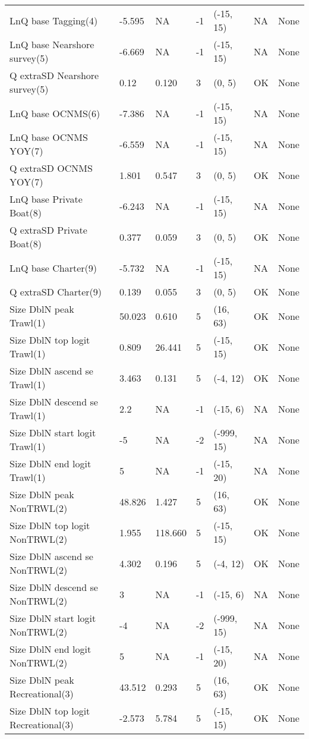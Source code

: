 \documentclass[11pt,
  letterpaper,
]{article}
\begin{document}
\begin{landscape}
\begin{longtable}[t]{>{\raggedright\arraybackslash}p{7.5cm}lllll>{\raggedright\arraybackslash}p{3.5cm}}
LnQ base Tagging(4) & -5.595 & NA & -1 & (-15, 15) & NA & None\\
LnQ base Nearshore survey(5) & -6.669 & NA & -1 & (-15, 15) & NA & None\\
Q extraSD Nearshore survey(5) & 0.12 & 0.120 & 3 & (0, 5) & OK & None\\
LnQ base OCNMS(6) & -7.386 & NA & -1 & (-15, 15) & NA & None\\
LnQ base OCNMS YOY(7) & -6.559 & NA & -1 & (-15, 15) & NA & None\\
Q extraSD OCNMS YOY(7) & 1.801 & 0.547 & 3 & (0, 5) & OK & None\\
LnQ base Private Boat(8) & -6.243 & NA & -1 & (-15, 15) & NA & None\\
Q extraSD Private Boat(8) & 0.377 & 0.059 & 3 & (0, 5) & OK & None\\
LnQ base Charter(9) & -5.732 & NA & -1 & (-15, 15) & NA & None\\
Q extraSD Charter(9) & 0.139 & 0.055 & 3 & (0, 5) & OK & None\\
Size DblN peak Trawl(1) & 50.023 & 0.610 & 5 & (16, 63) & OK & None\\
Size DblN top logit Trawl(1) & 0.809 & 26.441 & 5 & (-15, 15) & OK & None\\
Size DblN ascend se Trawl(1) & 3.463 & 0.131 & 5 & (-4, 12) & OK & None\\
Size DblN descend se Trawl(1) & 2.2 & NA & -1 & (-15, 6) & NA & None\\
Size DblN start logit Trawl(1) & -5 & NA & -2 & (-999, 15) & NA & None\\
Size DblN end logit Trawl(1) & 5 & NA & -1 & (-15, 20) & NA & None\\
Size DblN peak NonTRWL(2) & 48.826 & 1.427 & 5 & (16, 63) & OK & None\\
Size DblN top logit NonTRWL(2) & 1.955 & 118.660 & 5 & (-15, 15) & OK & None\\
Size DblN ascend se NonTRWL(2) & 4.302 & 0.196 & 5 & (-4, 12) & OK & None\\
Size DblN descend se NonTRWL(2) & 3 & NA & -1 & (-15, 6) & NA & None\\
Size DblN start logit NonTRWL(2) & -4 & NA & -2 & (-999, 15) & NA & None\\
Size DblN end logit NonTRWL(2) & 5 & NA & -1 & (-15, 20) & NA & None\\
Size DblN peak Recreational(3) & 43.512 & 0.293 & 5 & (16, 63) & OK & None\\
Size DblN top logit Recreational(3) & -2.573 & 5.784 & 5 & (-15, 15) & OK & None\\

\end{longtable}
\end{landscape}
\end{document}
